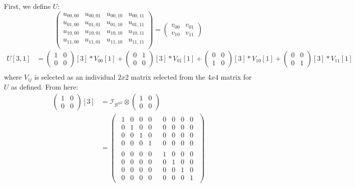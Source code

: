 \documentclass{exam} %
\newcommand{\cl}[1]{\mathcal{#1}}  %
\theoremstyle{plain}
\theoremstyle{definition}
\theoremstyle{remark}
\newcommand{\pmat}[1]{ \begin{pmatrix} #1 \end{pmatrix} }
\numberwithin{equation}{section}  %
\begin{document}
\begin{questions}
\begin{parts}
\begin{solution}
    First, we define $U$:
      \[
        \pmat{
          u_{00,00}&u_{00,01}&u_{00,10}&u_{00,11}\\
          u_{01,00}&u_{01,01}&u_{01,10}&u_{01,11}\\
          u_{10,00}&u_{10,01}&u_{10,10}&u_{10,11}\\
          u_{11,00}&u_{11,01}&u_{11,10}&u_{11,11}\\
        }
        =
        \pmat{v_{00}&v_{01}\\
              v_{10}&v_{11}
        }
      \]
      \begin{align*}
        U[3,1] &= \pmat{1&0\\0&0}[3]*V_{00}[1] + 
                  \pmat{0&1\\0&0}[3]*V_{01}[1] +
                  \pmat{0&0\\1&0}[3]*V_{10}[1] +
                  \pmat{0&0\\0&1}[3]*V_{11}[1] \\
      \end{align*}
      where $V_{ij}$ is selected as an individual $2x2$ matrix selected from the 
      $4x4$ matrix for $U$ as defined. From here:
      \begin{align*}
          \pmat{1&0\\0&0}[3] &= \cl{I}_{\cl{B}^{\otimes2}}\otimes\pmat{1&0\\0&0}\\
          &= \pmat{\begin{smallmatrix}1&0&0&0\\0&1&0&0\\0&0&1&0\\0&0&0&1\end{smallmatrix}&
                   \begin{smallmatrix}0&0&0&0\\0&0&0&0\\0&0&0&0\\0&0&0&0\end{smallmatrix}\\
                   \begin{smallmatrix}0&0&0&0\\0&0&0&0\\0&0&0&0\\0&0&0&0\end{smallmatrix}&
                   \begin{smallmatrix}1&0&0&0\\0&1&0&0\\0&0&1&0\\0&0&0&1\end{smallmatrix}}

\end{align*}
\end{solution}
\end{parts}
\end{questions}
\end{document}
